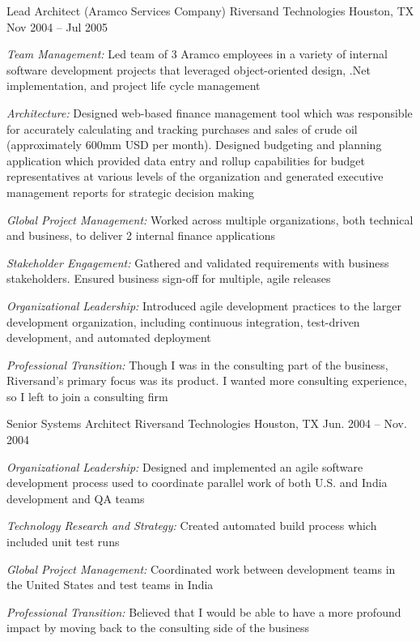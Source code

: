 \begin{cventries}

\cventry 
{Lead Architect (Aramco Services Company)}
{Riversand Technologies}
{Houston, TX}
{Nov 2004 – Jul 2005}
{ %
\begin{cvitems}
\item {\emph{Team Management:} Led team of 3 Aramco employees in a variety of internal software development projects that leveraged object-oriented design, .Net implementation, and project life cycle management }
\item {\emph{Architecture:} Designed web-based finance management tool which was responsible for accurately calculating and tracking purchases and sales of crude oil (approximately 600mm USD per month). Designed budgeting and planning application which provided data entry and rollup capabilities for budget representatives at various levels of the organization and generated executive management reports for strategic decision making }
\item {\emph{Global Project Management:} Worked across multiple organizations, both technical and business, to deliver 2 internal finance applications }
\item {\emph{Stakeholder Engagement:} Gathered and validated requirements with business stakeholders. Ensured business sign-off for multiple, agile releases }
\item {\emph{Organizational Leadership:} Introduced agile development practices to the larger development organization, including continuous integration, test-driven development, and automated deployment }
\item {\emph{Professional Transition:} Though I was in the consulting part of the business, Riversand’s primary focus was its product. I wanted more consulting experience, so I left to join a consulting firm }
\end{cvitems}
}


\cventry 
{Senior Systems Architect}
{Riversand Technologies}
{Houston, TX}
{Jun. 2004 – Nov. 2004}
{ %
\begin{cvitems}
\item {\emph{Organizational Leadership:} Designed and implemented an agile software development process used to coordinate parallel work of both U.S. and India development and QA teams }
\item {\emph{Technology Research and Strategy:} Created automated build process which included unit test runs }
\item {\emph{Global Project Management:} Coordinated work between development teams in the United States and test teams in India }
\item {\emph{Professional Transition:} Believed that I would be able to have a more profound impact by moving back to the consulting side of the business }
\end{cvitems}
}


\end{cventries}
